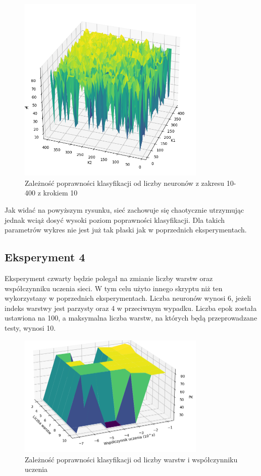 \documentclass{article}
\begin{document}
\begin{figure}[H]
    \centering
    \includegraphics[width=0.8\textwidth, keepaspectratio]{k1_k2_3.png}
    \caption{Zależność poprawności klasyfikacji od liczby neuronów z zakresu 10-400 z krokiem 10}
    \label{fig:k1k2_3}
\end{figure}

Jak widać na powyższym rysunku, sieć zachowuje się chaotycznie utrzymując jednak wciąż dosyć wysoki poziom poprawności klasyfikacji.
Dla takich parametrów wykres nie jest już tak płaski jak w poprzednich eksperymentach.
\subsection{Eksperyment 4}
Eksperyment czwarty będzie polegał na zmianie liczby warstw oraz współczynniku uczenia sieci.
W tym celu użyto innego skryptu niż ten wykorzystany w poprzednich eksperymentach.
Liczba neuronów wynosi 6, jeżeli indeks warstwy jest parzysty oraz 4 w przeciwnym wypadku.
Liczba epok została ustawiona na 100, a maksymalna liczba warstw, na których będą przeprowadzane testy, wynosi 10.

\begin{figure}[H]
    \centering
    \includegraphics[width=0.8\textwidth, keepaspectratio]{LR_LAYERS_100ECHO.PNG}
    \caption{Zależność poprawności klasyfikacji od liczby warstw i współczynniku uczenia}
    \label{fig:lr_layers_1}
\end{figure}
\end{document}
